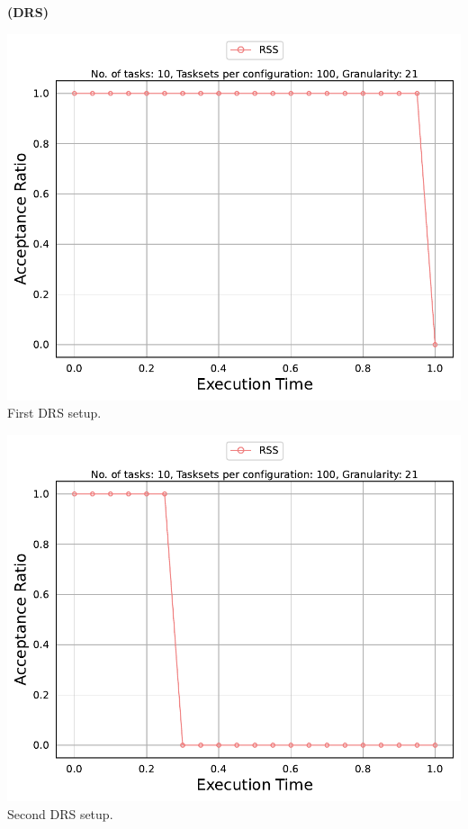 \documentclass[]{article}
\begin{document}
	\begin{minipage}[t]{0.48\linewidth}
		\centering
		\textbf{(DRS)}
		\vspace{0.3cm}
		
		\includegraphics[width=\linewidth]{RSS_1stSetup_DRS.pdf}
		First DRS setup.
		\vspace{0.3cm}
		
		\includegraphics[width=\linewidth]{RSS_2ndSetup_DRS.pdf}
		Second DRS setup.
		\vspace{0.3cm}
		

\end{minipage}
\end{document}
